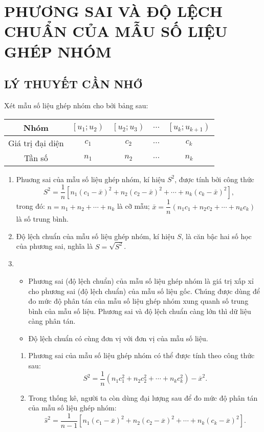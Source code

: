 \section{PHƯƠNG SAI VÀ ĐỘ LỆCH CHUẨN CỦA MẪU SỐ LIỆU GHÉP NHÓM}
\subsection{LÝ THUYẾT CẦN NHỚ}
	Xét mẫu số liệu ghép nhóm cho bởi bảng sau:
\begin{center}
	\begin{tabular}{|c|c|c|c|c|}
		\hline Nhóm &{$\left[u_1; u_2\right)$} &{$\left[u_2; u_3\right)$} & $\ldots$ &{$\left[u_k; u_{k+1}\right)$} \\
		\hline Giá trị đại diện & $c_1$ & $c_2$ & $\ldots$ & $c_k$ \\
		\hline Tần số & $n_1$ & $n_2$ & $\ldots$ & $n_k$ \\
		\hline
	\end{tabular}
\end{center}
\begin{enumerate}[\iconMT] 
	\item {} Phuơng sai của mẫu số liệu ghép nhóm, kí hiệu $S^2$, được tính bởi công thức
	$$S^2=\dfrac{1}{n}\left[n_1\left(c_1-\bar{x}\right)^2+n_2\left(c_2-\bar{x}\right)^2+\cdots+n_k\left(c_k-\bar{x}\right)^2\right],$$
	trong đó: $n=n_1+n_2+\cdots+n_k$ là cỡ mẫu; $\bar{x}=\dfrac{1}{n}\left(n_1 c_1+n_2 c_2+\cdots+n_k c_k\right)$ là số trung bình.
	\item {} Độ lệch chuẩn của mẫu số liệu ghép nhóm, kí hiệu $S$, là căn bậc hai số học của phương sai, nghĩa là $S=\sqrt{S^2}$.
	\item {}
	\begin{itemize}
		\item [\iconCH] Phương sai (độ lệch chuẩn) của mẫu số liệu ghép nhóm là giá trị xấp xỉ cho phương sai (độ lệch chuẩn) của mẫu số liệu gốc. Chúng được dùng để đo mức độ phân tán của mẫu số liệu ghép nhóm xung quanh số trung bình của mẫu số liệu. Phương sai và độ lệch chuẩn càng lớn thì dữ liệu càng phân tán.
		\item [\iconCH] Độ lệch chuẩn có cùng đơn vị với đơn vị của mẫu số liệu.
	\end{itemize}
\begin{note}
	\begin{enumerate}
		\item Phương sai của mẫu số liệu ghép nhóm có thể được tính theo công thức sau:
		$$S^2=\dfrac{1}{n}\left(n_1 c_1^2+n_2 c_2^2+\cdots+n_k c_k^2\right)-\overline{x}^2.$$
		\item Trong thống kê, người ta còn dùng đại lượng sau để đo mức độ phân tán của mẫu số liệu ghép nhóm:
		$$\hat{s}^2=\dfrac{1}{n-1}\left[n_1\left(c_1-\overline{x}\right)^2+n_2\left(c_2-\overline{x}\right)^2+\cdots+n_k\left(c_k-\overline{x}\right)^2\right].$$
	\end{enumerate}
\end{note}
\end{enumerate}
